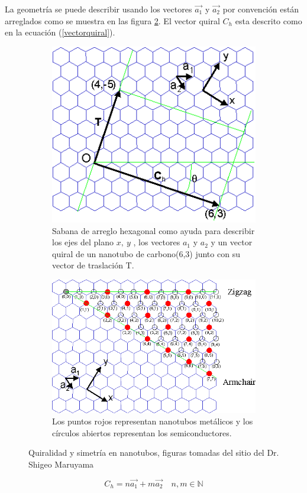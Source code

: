 La geometría se puede describir usando los vectores $\vec{a_1}$ y $\vec{a_2}$ por convención están arreglados como se muestra en las figura \ref{fig:CNT}. El vector quiral $C_h$ esta descrito como en la ecuación (\ref{vectorquiral}).\\

\begin{figure}[!h]
\begin{subfigure}{.5\textwidth}
  \centering
  \includegraphics[width=.5\linewidth]{ChCNT.png}  
  \caption{Sabana de arreglo hexagonal como ayuda para describir los ejes del plano $x,\ y$ , los vectores $a_1$ y $a_2$ y un vector quiral de un nanotubo de carbono(6,3) junto con su vector de traslación T.}
  \label{fig:ChCNT}
\end{subfigure}
\begin{subfigure}{.5\textwidth}
  \centering
  \includegraphics[width=.7\linewidth]{NT.png}  
  \caption{Los puntos rojos representan nanotubos metálicos y los círculos abiertos representan los semiconductores.}
  \label{fig:CNT}
\end{subfigure}
\caption{Quiralidad y simetría en nanotubos, figuras tomadas del sitio del Dr. Shigeo Maruyama \cite{ShigeoChiral}}
\label{fig:GeoVectChir}
\end{figure}

\begin{equation} \label{vectorquiral}
    C_h = n\vec{a_1} + m\vec{a_2}\quad n,m\in \mathbb{N}
\end{equation}

